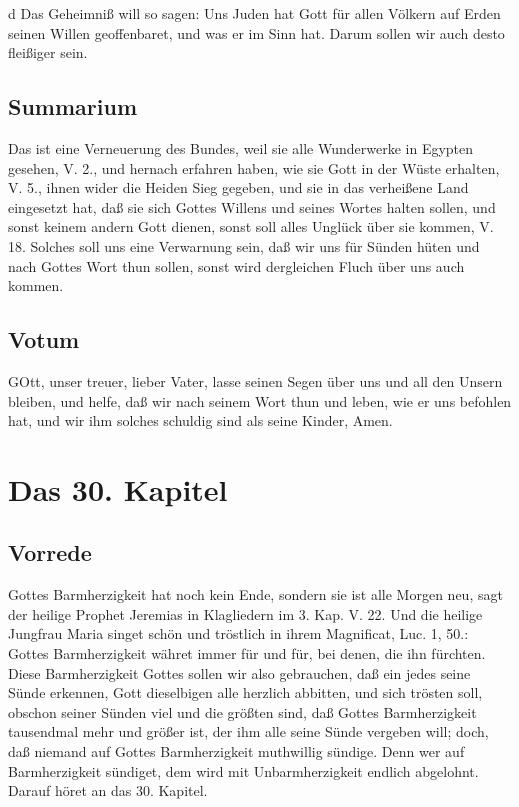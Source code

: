 d Das Geheimniß will so sagen: Uns Juden hat Gott für allen Völkern auf Erden seinen Willen geoffenbaret, und was er im Sinn hat. Darum sollen wir auch desto fleißiger sein.

\section{Summarium}

Das ist eine Verneuerung des Bundes, weil sie alle Wunderwerke in Egypten gesehen, V. 2., und hernach erfahren haben, wie sie Gott in der Wüste erhalten, V. 5., ihnen wider die Heiden Sieg gegeben, und sie in das verheißene Land eingesetzt hat, daß sie sich Gottes Willens und seines Wortes halten sollen, und sonst keinem andern Gott dienen, sonst soll alles Unglück über sie kommen, V. 18. Solches soll uns eine Verwarnung sein, daß wir uns für Sünden hüten und nach Gottes Wort thun sollen, sonst wird dergleichen Fluch über uns auch kommen.

\section{Votum}

GOtt, unser treuer, lieber Vater, lasse seinen Segen über uns und all den Unsern bleiben, und helfe, daß wir nach seinem Wort thun und leben, wie er uns befohlen hat, und wir ihm solches schuldig sind als seine Kinder, Amen.

\chapter{Das 30. Kapitel}

\section{Vorrede}

Gottes Barmherzigkeit hat noch kein Ende, sondern sie ist alle Morgen neu, sagt der heilige Prophet Jeremias in Klagliedern im 3. Kap. V. 22. Und die heilige Jungfrau Maria singet schön und tröstlich in ihrem Magnificat, Luc. 1, 50.: Gottes Barmherzigkeit währet immer für und für, bei denen, die ihn fürchten. Diese Barmherzigkeit Gottes sollen wir also gebrauchen, daß ein jedes seine Sünde erkennen, Gott dieselbigen alle herzlich abbitten, und sich trösten soll, obschon seiner Sünden viel und die größten sind, daß Gottes Barmherzigkeit tausendmal mehr und größer ist, der ihm alle seine Sünde vergeben will; doch, daß niemand auf Gottes Barmherzigkeit muthwillig sündige. Denn wer auf Barmherzigkeit sündiget, dem wird mit Unbarmherzigkeit endlich abgelohnt. Darauf höret an das 30. Kapitel.

